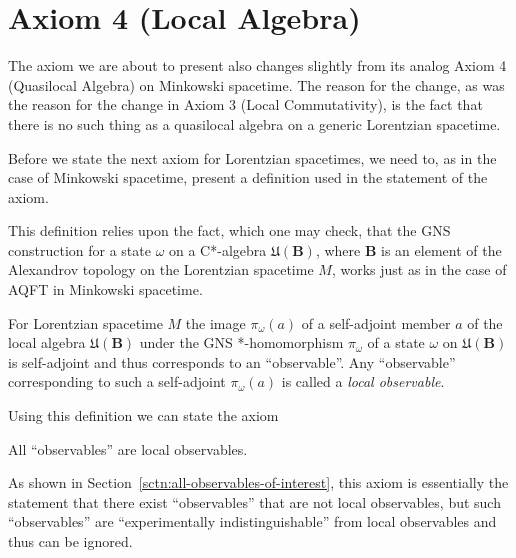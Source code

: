 \section{Axiom 4 (Local Algebra)}\label{sctn:axiom-4-(local-algebra)}
The axiom we are about to present also changes slightly from its analog Axiom 4 (Quasilocal Algebra) on Minkowski spacetime. The reason for the change, as was the reason for the change in Axiom 3 (Local Commutativity), is the fact that there is no such thing as a quasilocal algebra on a generic Lorentzian spacetime.

Before we state the next axiom for Lorentzian spacetimes, we need to, as in the case of Minkowski spacetime, present a definition used in the statement of the axiom.

This definition relies upon the fact, which one may check, that the GNS construction for a state $\omega$ on a C*-algebra $\mathfrak{U}(\mathbf{B})$, where $\mathbf{B}$ is an element of the Alexandrov topology on the Lorentzian spacetime $M$, works just as in the case of AQFT in Minkowski spacetime.

\begin{definition}
    For Lorentzian spacetime $M$ the image $\pi_\omega(a)$ of a self-adjoint member $a$ of the local algebra $\mathfrak{U}(\mathbf{B})$ under the GNS *-homomorphism $\pi_\omega$ of a state $\omega$ on $\mathfrak{U}(\mathbf{B})$ is self-adjoint and thus corresponds to an ``observable''. Any ``observable'' corresponding to such a self-adjoint $\pi_\omega(a)$ is called a \textit{local observable}.
\end{definition}

Using this definition we can state the axiom

\begin{axiom}
    All ``observables'' are local observables.
\end{axiom}

As shown in Section~\ref{sctn:all-observables-of-interest}, this axiom is essentially the statement that there exist ``observables'' that are not local observables, but such ``observables'' are ``experimentally indistinguishable'' from local observables and thus can be ignored.
